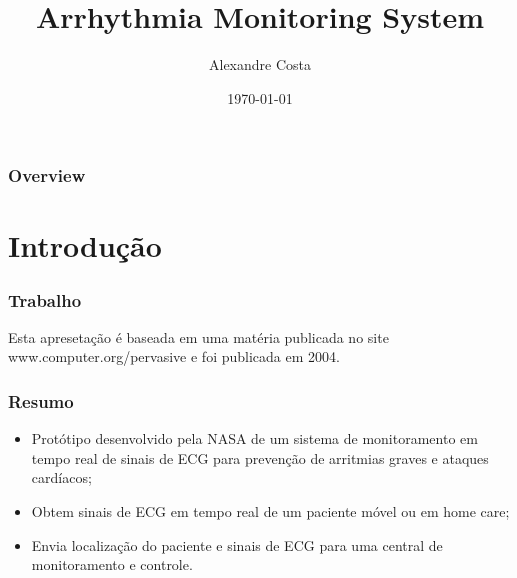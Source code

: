 \documentclass{beamer}
\title[AMS]{Arrhythmia Monitoring System} %
\author{Alexandre Costa} %
\institute[UFPEL] %
{
Universidade Federal de Pelotas \\ %
\medskip
\textit{alexandre.gcosta@gmail.com} %
}
\date{\today} %
\begin{document}
\begin{frame}
\titlepage %
\end{frame}

\begin{frame}
\frametitle{Overview} %
\tableofcontents %
\end{frame}


\section{Introdução}

\begin{frame}
	\frametitle{Trabalho}
	Esta apresetação é baseada em uma matéria publicada no site www.computer.org/pervasive e foi publicada em 2004.
\end{frame}


\begin{frame}
	\frametitle{Resumo}
	\begin{itemize}
		\item Protótipo desenvolvido pela NASA de um sistema de monitoramento em tempo real de sinais de ECG para prevenção de arritmias graves e ataques cardíacos;
		\item Obtem sinais de ECG em tempo real de um paciente móvel ou em home care;
		\item Envia localização do paciente e sinais de ECG para uma central de monitoramento e controle.
	\end{itemize}
\end{frame}
\end{document}
